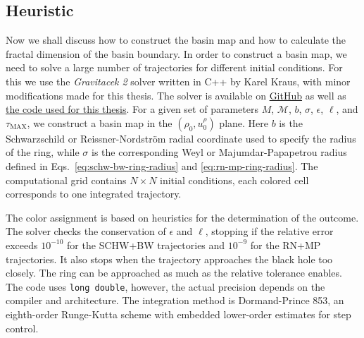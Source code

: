 \subsection{Heuristic}
Now we shall discuss how to construct the basin map and how to calculate the
fractal dimension of the basin boundary. In order to construct a basin map, we
need to solve a large number of trajectories for different initial conditions.
For this we use the \textit{Gravitacek 2} solver written in C++ by Karel Kraus,
with minor modifications made for this thesis. The solver is available on \href{https://github.com/ImmanuelKant314/Gravitacek-2}{GitHub} as well as \href{https://github.com/DJopek/chaos}{the code used for this thesis}. For a given set of
parameters \(M\), \(\mathcal{M}\), \(b\), \(\sigma\), \(\epsilon\), \(\ell\), and
\(\tau_{\mathrm{MAX}}\), we construct a basin map in the
\((\rho_0,u^\rho_0)\) plane. Here \(b\) is the Schwarzschild or
Reissner-Nordstr\"om radial coordinate used to specify the radius of the ring, while
\(\sigma\) is the corresponding Weyl or Majumdar-Papapetrou radius
defined in Eqs.~\eqref{eq:schw-bw-ring-radius} and
\eqref{eq:rn-mp-ring-radius}. The computational grid contains \(N\times N\)
initial conditions, each colored cell corresponds to one integrated trajectory.

The color assignment is based on heuristics for the determination of the outcome. The solver checks
the conservation of \(\epsilon\) and \(\ell\), stopping if the relative error exceeds
\(10^{-10}\) for the SCHW+BW trajectories and \(10^{-9}\) for the RN+MP trajectories.
It also stops when the trajectory approaches the black hole too
closely. The ring can be approached as much as the relative tolerance enables. The code uses \texttt{long double}, however, the actual precision depends on the
compiler and architecture. The integration method is Dormand-Prince 853, an
eighth-order Runge-Kutta scheme with embedded lower-order estimates for step
control.

